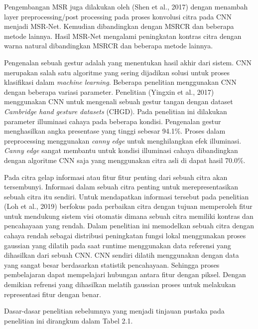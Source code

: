 Pengembangan MSR juga dilakukan oleh (Shen et al., 2017) dengan menambah layer preprocessing/post processing pada proses konvolusi citra pada CNN menjadi MSR-Net. Kemudian dibandingkan dengan MSRCR dan beberapa metode lainnya.  
Hasil MSR-Net mengalami peningkatan kontras citra dengan warna natural dibandingkan MSRCR dan beberapa metode lainnya.

Pengenalan sebuah gestur adalah yang menentukan hasil akhir dari sistem. CNN merupakan salah satu algoritme yang sering dijadikan solusi untuk proses klasifikasi dalam \emph{machine learning}. Beberapa penelitian menggunakan CNN dengan beberapa variasi parameter. Penelitian (Yingxin et al., 2017) menggunakan CNN untuk mengenali sebuah gestur tangan dengan dataset \emph{Cambridge hand gesture datasets} (CHGD). Pada penelitian ini dilakukan parameter illuminasi cahaya pada beberapa kondisi. Pengenalan gestur menghasilkan angka presentase yang tinggi sebesar 94.1\%. Proses dalam preprocessing menggunakan \emph{canny edge} untuk menghilangkan efek illuminasi. \emph{Canny edge} sangat membantu untuk kondisi illuminasi cahaya dibandingkan dengan algoritme CNN saja yang menggunakan citra asli di dapat hasil 70.0\%.

Pada citra gelap informasi atau fitur fitur penting dari sebuah citra akan tersembunyi. Informasi dalam sebuah citra penting untuk merepresentasikan sebuah citra itu sendiri. Untuk mendapatkan informasi tersebut pada penelitian (Loh et al., 2019) berfokus pada perbaikan citra dengan tujuan memperoleh fitur untuk mendukung sistem visi otomatis dimana sebuah citra memiliki kontras dan pencahayaan yang rendah. Dalam penelitian ini memodelkan sebuah citra dengan cahaya rendah sebagai distribusi peningkatan fungsi lokal menggunakan proses gaussian yang dilatih pada saat runtime menggunakan data referensi yang dihasilkan dari sebuah CNN. CNN sendiri dilatih menggunakan dengan data yang sangat besar berdasarkan statistik pencahayaan. Sehingga proses pembelajaran dapat mempelajari hubungan antara fitur dengan piksel. Dengan demikian refrensi  yang dihasilkan melatih gaussian proses untuk melakukan representasi fitur dengan benar. 

Dasar-dasar penelitian sebelumnya yang menjadi tinjauan pustaka pada penelitian ini dirangkum dalam Tabel 2.1. 

